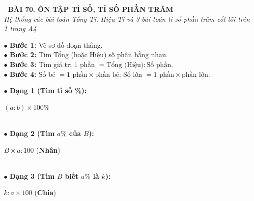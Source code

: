 \documentclass[14pt,a4paper,oneside]{extbook}
\begin{document}
\noindent
\begin{tcolorbox}[
  enhanced,
  colback=teal!8!white,
  colframe=teal!80!black,
  arc=3mm,
  boxrule=1.1pt,
  width=\linewidth,
  halign=center,
  top=2.2mm, bottom=2.2mm,
  left=3mm, right=3mm,
  drop fuzzy shadow
]
  {\large\bfseries\color{teal!95!black}\faBookmark\ BÀI 70. ÔN TẬP TỈ SỐ, TỈ SỐ PHẦN TRĂM}\\[2pt]
  {\scriptsize\color{black!75}\itshape Hệ thống các bài toán Tổng-Tỉ, Hiệu-Tỉ và 3 bài toán tỉ số phần trăm cốt lõi trên 1 trang A4}
\end{tcolorbox}

\vspace{3.2mm}
\noindent
\begin{minipage}[t]{0.54\textwidth}
  \begin{tcolorbox}[
    enhanced,
    title={\footnotesize\bfseries\color{white}\faBarChart\ 1. Bài toán Tổng-Tỉ và Hiệu-Tỉ},
    colback=blue!2!white,
    colframe=blue!75!black,
    arc=2.5mm, boxrule=0.8pt, top=1.8mm, bottom=1.8mm, left=2.2mm, right=2.2mm
  ]
    \footnotesize
    $\bullet$ \textbf{Bước 1:} Vẽ sơ đồ đoạn thẳng.\\
    $\bullet$ \textbf{Bước 2:} Tìm Tổng (hoặc Hiệu) số phần bằng nhau.\\
    $\bullet$ \textbf{Bước 3:} Tìm giá trị $1$ phần $= \text{Tổng (Hiệu)} : \text{Số phần}$.\\
    $\bullet$ \textbf{Bước 4:} Số bé $= 1\text{ phần} \times \text{phần bé}$; Số lớn $= 1\text{ phần} \times \text{phần lớn}$.
  \end{tcolorbox}
\end{minipage}%
\hfill
\begin{minipage}[t]{0.44\textwidth}
  \begin{tcolorbox}[
    enhanced,
    title={\footnotesize\bfseries\color{white}\faPercent\ 2. Ba dạng toán Tỉ số phần trăm},
    colback=teal!2!white,
    colframe=teal!75!black,
    arc=2.5mm, boxrule=0.8pt, top=1.8mm, bottom=1.8mm, left=2mm, right=2mm
  ]
    \footnotesize
    $\bullet$ \textbf{Dạng 1 (Tìm tỉ số \%):}\\
    \centerline{$(a : b) \times 100\%$}\\
    $\bullet$ \textbf{Dạng 2 (Tìm $a\%$ của $B$):}\\
    \centerline{$B \times a : 100$ (\textbf{Nhân})}\\
    $\bullet$ \textbf{Dạng 3 (Tìm $B$ biết $a\%$ là $k$):}\\
    \centerline{$k : a \times 100$ (\textbf{Chia})}
  \end{tcolorbox}
\end{minipage}
\end{document}
